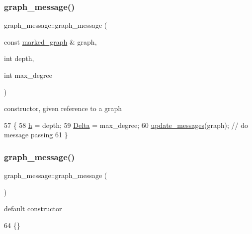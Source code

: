 \subsubsection{\texorpdfstring{graph\+\_\+message()}{graph\_message()}\hspace{0.1cm}{\footnotesize\ttfamily [1/2]}}
{\footnotesize\ttfamily graph\+\_\+message\+::graph\+\_\+message (\begin{DoxyParamCaption}\item[{const \hyperlink{classmarked__graph}{marked\+\_\+graph} \&}]{graph,  }\item[{int}]{depth,  }\item[{int}]{max\+\_\+degree }\end{DoxyParamCaption})\hspace{0.3cm}{\ttfamily [inline]}}



constructor, given reference to a graph 


\begin{DoxyCode}
57                                                                      \{
58     \hyperlink{classgraph__message_a934d63ed7275c211e13c6fb68824ed46}{h} = depth;
59     \hyperlink{classgraph__message_a45dfd061b7bc73572e5132fbf66efd55}{Delta} = max\_degree;
60     \hyperlink{classgraph__message_a40dadc59d582b290202e79bc4a9e896c}{update\_messages}(graph); \textcolor{comment}{// do message passing}
61   \}
\end{DoxyCode}
\mbox{\label{classgraph__message_aa21140453eb0e1de98a2ddfcf2832aeb}} 
\subsubsection{\texorpdfstring{graph\+\_\+message()}{graph\_message()}\hspace{0.1cm}{\footnotesize\ttfamily [2/2]}}
{\footnotesize\ttfamily graph\+\_\+message\+::graph\+\_\+message (\begin{DoxyParamCaption}{ }\end{DoxyParamCaption})\hspace{0.3cm}{\ttfamily [inline]}}



default constructor 


\begin{DoxyCode}
64 \{\}
\end{DoxyCode}


